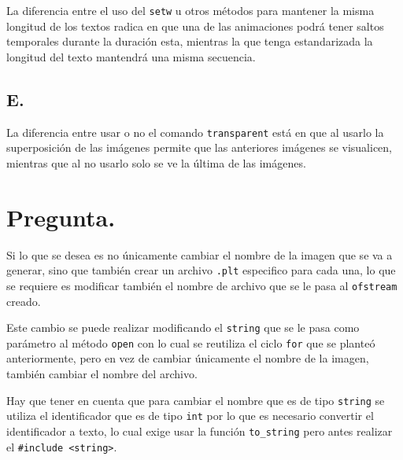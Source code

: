 \documentclass[10pt]{article}
\begin{document}
    La diferencia entre el uso del \texttt{setw} u otros métodos para mantener la misma longitud de los textos radica en que una de las animaciones podrá tener saltos temporales durante la duración esta, mientras la que tenga estandarizada la longitud del texto mantendrá una misma secuencia.

    \subsection*{E.}
    La diferencia entre usar o no el comando \texttt{transparent} está en que al usarlo la superposición de las imágenes permite que las anteriores imágenes se visualicen, mientras que al no usarlo solo se ve la última de las imágenes.

    
    
    \section{Pregunta.}
    Si lo que se desea es no únicamente cambiar el nombre de la imagen que se va a generar, sino que también crear un archivo \texttt{.plt} especifico para cada una, lo que se requiere es modificar también el nombre de archivo que se le pasa al \texttt{ofstream} creado.
    
    Este cambio se puede realizar modificando el \texttt{string} que se le pasa como parámetro al método \texttt{open} con lo cual se reutiliza el ciclo \texttt{for} que se planteó anteriormente, pero en vez de cambiar únicamente el nombre de la imagen, también cambiar el nombre del archivo. 
    
    Hay que tener en cuenta que para cambiar el nombre que es de tipo \texttt{string} se utiliza el identificador que es de tipo \texttt{int} por lo que es necesario convertir el identificador a texto, lo cual exige usar la función \texttt{to\_string} pero antes realizar el \texttt{\#include <string>}.
\end{document}
